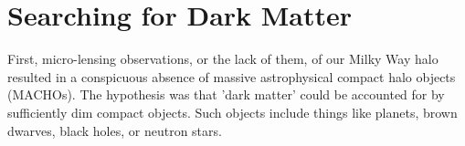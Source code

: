 \section{Searching for Dark Matter}\label{sec:dm_search}

First, micro-lensing observations, or the lack of them, of our Milky Way halo resulted in a conspicuous absence of massive astrophysical compact halo objects (MACHOs).
The hypothesis was that 'dark matter' could be accounted for by sufficiently dim compact objects.
Such objects include things like planets, brown dwarves, black holes, or neutron stars.

